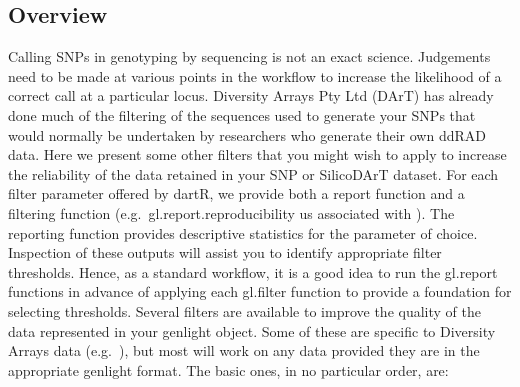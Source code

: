 \documentclass[
  letterpaper,
  DIV=11,
  numbers=noendperiod]{scrreprt}
\let\textttOrig\texttt
\renewcommand{\texttt}[1]{\textttOrig{\color{blue}{#1}}}
\begin{document}

\hypertarget{overview}{%
\subsection*{Overview}\label{overview}}

Calling SNPs in genotyping by sequencing is not an exact science.
Judgements need to be made at various points in the workflow to increase
the likelihood of a correct call at a particular locus. Diversity Arrays
Pty Ltd (DArT) has already done much of the filtering of the sequences
used to generate your SNPs that would normally be undertaken by
researchers who generate their own ddRAD data. Here we present some
other filters that you might wish to apply to increase the reliability
of the data retained in your SNP or SilicoDArT dataset. For each filter
parameter offered by dartR, we provide both a report function and a
filtering function (e.g.~gl.report.reproducibility us associated with
\texttt{gl.filter.reproducability}). The reporting function provides
descriptive statistics for the parameter of choice. Inspection of these
outputs will assist you to identify appropriate filter thresholds.
Hence, as a standard workflow, it is a good idea to run the gl.report
functions in advance of applying each gl.filter function to provide a
foundation for selecting thresholds. Several filters are available to
improve the quality of the data represented in your genlight object.
Some of these are specific to Diversity Arrays data
(e.g.~\texttt{gl.filter.reproducibility}), but most will work on any
data provided they are in the appropriate genlight format. The basic
ones, in no particular order, are:
\end{document}
